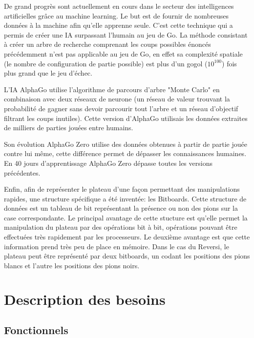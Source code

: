 \documentclass[12pt]{article}
\begin{document}
\medbreak
De grand progrès sont actuellement en cours dans le secteur des intelligences artificielles grâce au machine learning. Le but est de fournir de nombreuses données à la machine afin qu'elle apprenne seule. C'est cette technique qui a permis de créer une IA surpassant l'humain au jeu de Go. La méthode consistant à créer un arbre de recherche comprenant les coups possibles énoncés précédemment n'est pas applicable au jeu de Go, en effet sa complexité spatiale (le nombre de configuration de partie possible) est plus d'un gogol
(\begin{math}
10^{100}
\end{math})
fois plus grand que le jeu d'échec.

L'IA AlphaGo\cite{AlphaGo} utilise l’algorithme de parcours d'arbre "Monte Carlo" en combinaison avec deux réseaux de neurone (un réseau de valeur trouvant la probabilité de gagner sans devoir parcourir tout l'arbre et un réseau d'objectif filtrant les coups inutiles). Cette version d'AlphaGo utilisais les données extraites de milliers de parties jouées entre humains.

Son évolution AlphaGo Zero\cite{AlphaGoZero} utilise des données obtenues à partir de partie jouée contre lui même, cette différence permet de dépasser les connaissances humaines. En 40 jours d'apprentissage AlphaGo Zero dépasse toutes les versions précédentes.

\medbreak
Enfin, afin de représenter le plateau d'une façon permettant des manipulations rapides, une structure spécifique a été inventée: les Bitboards\cite{bitboard}. Cette structure de données est un tableau de bit représentant la présence ou non des pions sur la case correspondante. Le principal avantage de cette stucture est qu'elle permet la manipulation du plateau par des opérations bit à bit, opérations pouvant être effectuées très rapidement par les processeurs. Le deuxième avantage est que cette information prend très peu de place en mémoire. Dans le cas du Reversi, le plateau peut être représenté par deux bitboards, un codant les positions des pions blancs et l'autre les positions des pions noirs.



\section{Description des besoins}
\subsection{Fonctionnels}
\end{document}
